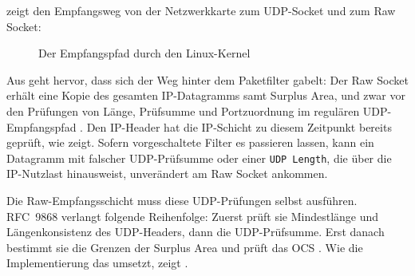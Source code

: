  zeigt den Empfangsweg von der Netzwerkkarte zum UDP-Socket und zum Raw Socket:

\begin{figure}[H]
  \centering
  \caption[Der Empfangspfad durch den Linux-Kernel]{Der Empfangspfad durch den Linux-Kernel
    \cite{stephan2024packetpath,man7raw}}
  \label{fig:empfangspfad}
\end{figure}

Aus  geht hervor, dass sich der Weg hinter dem Paketfilter gabelt: Der Raw Socket erhält eine
Kopie des gesamten IP-Datagramms samt Surplus Area, und zwar vor den Prüfungen von Länge, Prüfsumme und Portzuordnung im
regulären UDP-Empfangspfad \cite{man7raw,stephan2024packetpath}. Den IP-Header hat die IP-Schicht zu diesem Zeitpunkt
bereits geprüft, wie  zeigt. Sofern vorgeschaltete Filter es passieren lassen, kann ein
Datagramm mit falscher UDP-Prüfsumme oder einer \texttt{UDP Length}, die über die IP-Nutzlast hinausweist, unverändert
am Raw Socket ankommen.

Die Raw-Empfangsschicht muss diese UDP-Prüfungen selbst ausführen. RFC~9868 verlangt folgende Reihenfolge: Zuerst prüft
sie Mindestlänge und Längenkonsistenz des UDP-Headers, dann die UDP-Prüfsumme. Erst danach bestimmt sie die Grenzen der
Surplus Area und prüft das OCS \cite[Sec.~10 und 14]{rfc9868}. Wie die Implementierung das umsetzt, zeigt
.

